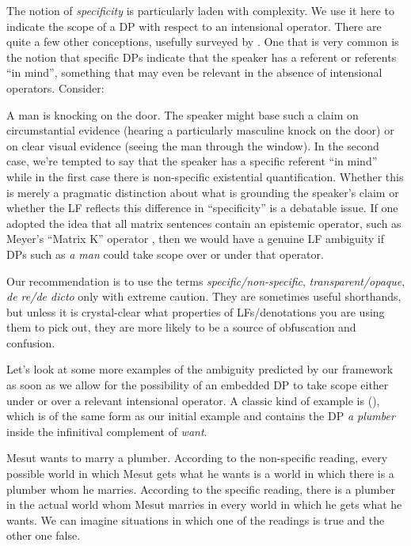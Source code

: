 The notion of \emph{specificity} is particularly laden with complexity. We use
it here to indicate the scope of a DP with respect to an intensional operator.
There are quite a few other conceptions, usefully surveyed by
\cite{heusinger-2011-specificity}. One that is very common is the notion that
specific DPs indicate that the speaker has a referent or referents ``in mind'',
something that may even be relevant in the absence of intensional operators.
Consider:

\ex
A man is knocking on the door.
\xe
%
The speaker might base such a claim on circumstantial evidence (hearing a
particularly masculine knock on the door) or on clear visual evidence (seeing
the man through the window). In the second case, we're tempted to say that the
speaker has a specific referent ``in mind'' while in the first case there is
non-specific existential quantification. Whether this is merely a pragmatic
distinction about what is grounding the speaker's claim or whether the LF
reflects this difference in ``specificity'' is a debatable issue. If one adopted
the idea that all matrix sentences contain an epistemic operator, such as
Meyer's ``Matrix K'' operator \parencite{meyer-2013-thesis}, then we would have
a genuine LF ambiguity if DPs such as \emph{a man} could take scope over or
under that operator.

Our recommendation is to use the terms \emph{specific/non-specific},
\emph{transparent/opaque}, \emph{de re/de dicto} only with extreme caution. They
are sometimes useful shorthands, but unless it is crystal-clear what properties
of LFs/denotations you are using them to pick out, they are more likely to be a
source of obfuscation and confusion.

Let's look at some more examples of the ambiguity predicted by our framework as
soon as we allow for the possibility of an embedded DP to take scope either
under or over a relevant intensional operator. A classic kind of example is
(\nextx), which is of the same form as our initial example and contains the DP
\emph{a plumber} inside the infinitival complement of \emph{want}.

\ex Mesut wants to marry a plumber. \xe
%
According to the non-specific reading, every possible world in which Mesut gets
what he wants is a world in which there is a plumber whom he marries. According
to the specific reading, there is a plumber in the actual world whom Mesut
marries in every world in which he gets what he wants. We can imagine situations
in which one of the readings is true and the other one false.

